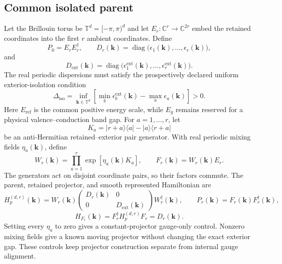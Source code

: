 \documentclass[11pt]{article}
\newenvironment{prospective}{\color{prospectivered}}{}
\begin{document}
\begin{prospective}
\subsection{Common isolated parent}
Let the Brillouin torus be $\mathbb T^d=[-\pi,\pi)^d$ and let
$E_r:\mathbb C^r\to\mathbb C^{2r}$ embed the retained coordinates into the first $r$
ambient coordinates. Define
\begin{equation}
 P_0=E_rE_r^\dagger,
 \qquad
 D_r(\mathbf k)=\operatorname{diag}\bigl(\epsilon_1(\mathbf k),\ldots,
 \epsilon_r(\mathbf k)\bigr),
\end{equation}
and
\begin{equation}
 D_{\mathrm{ext}}(\mathbf k)=\operatorname{diag}\bigl(
 \epsilon^{\mathrm{ext}}_1(\mathbf k),\ldots,
 \epsilon^{\mathrm{ext}}_r(\mathbf k)\bigr).
\end{equation}
The real periodic dispersions must satisfy the prospectively declared uniform
exterior-isolation condition
\begin{equation}
 \Delta_{\mathrm{iso}}=\inf_{\mathbf k\in\mathbb T^d}
 \left[
 \min_b\epsilon_b^{\mathrm{ext}}(\mathbf k)
 -\max_a\epsilon_a(\mathbf k)
 \right]>0.
\end{equation}
Here $E_{\mathrm{ref}}$ is the common positive energy scale, while $E_g$ remains
reserved for a physical valence--conduction band gap.
For $a=1,\ldots,r$, let
\begin{equation}
 K_a=|r+a\rangle\langle a|-|a\rangle\langle r+a|
\end{equation}
be an anti-Hermitian retained--exterior pair generator. With real periodic mixing fields
$\eta_a(\mathbf k)$, define
\begin{equation}
 W_r(\mathbf k)=\prod_{a=1}^{r}\exp\!\left[\eta_a(\mathbf k)K_a\right],
 \qquad
 F_r(\mathbf k)=W_r(\mathbf k)E_r.
\end{equation}
The generators act on disjoint coordinate pairs, so their factors commute. The parent,
retained projector, and smooth represented Hamiltonian are
\begin{equation}
 H_p^{(d,r)}(\mathbf k)=W_r(\mathbf k)
 \begin{pmatrix}D_r(\mathbf k)&0\\0&D_{\mathrm{ext}}(\mathbf k)\end{pmatrix}
 W_r^\dagger(\mathbf k),
 \qquad
 P_r(\mathbf k)=F_r(\mathbf k)F_r^\dagger(\mathbf k),
\end{equation}
\begin{equation}
 H_{F_r}(\mathbf k)=F_r^\dagger H_p^{(d,r)}F_r=D_r(\mathbf k).
\end{equation}
Setting every $\eta_a$ to zero gives a constant-projector gauge-only control. Nonzero
mixing fields give a known moving projector without changing the exact exterior gap.
These controls keep projector construction separate from internal gauge alignment.


\end{prospective}
\end{document}
